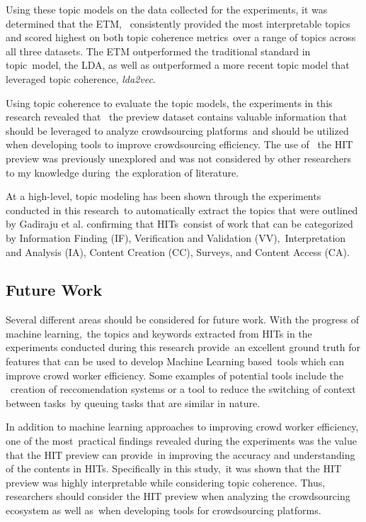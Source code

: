 \documentclass[letterpaper,12pt]{article}
\begin{document}
Using these topic models on the data collected for the experiments, it was determined that the ETM, \
consistently provided the most interpretable topics and scored highest on both topic coherence metrics\
over a range of topics across all three datasets. The ETM outperformed the traditional standard in topic\
model, the LDA, as well as outperformed a more recent topic model that leveraged topic coherence, \emph{lda2vec}.

Using topic coherence to evaluate the topic models, the experiments in this research revealed that \
the preview dataset contains valuable information that should be leveraged to analyze crowdsourcing platforms\
and should be utilized when developing tools to improve crowdsourcing efficiency. The use of \
the HIT preview was previously unexplored and was not considered by other researchers to my knowledge during\
the exploration of literature.

At a high-level, topic modeling has been shown through the experiments conducted in this research\
to automatically extract the topics that were outlined by Gadiraju et al. confirming that HITs\
consist of work that can be categorized by Information Finding (IF), Verification and Validation (VV),\
Interpretation and Analysis (IA), Content Creation (CC), Surveys, and Content Access (CA).
\subsection{Future Work}
Several different areas should be considered for future work. With the progress of machine learning,\
the topics and keywords extracted from HITs in the experiments conducted during this research provide\
an excellent ground truth for features that can be used to develop Machine Learning based\
tools which can improve crowd worker efficiency. Some examples of potential tools include the \
creation of reccomendation systems or a tool to reduce the switching of context between tasks\
by queuing tasks that are similar in nature.

In addition to machine learning approaches to improving crowd worker efficiency, one of the most\
practical findings revealed during the experiments was the value that the HIT preview can provide\
in improving the accuracy and understanding of the contents in HITs. Specifically in this study,\
it was shown that the HIT preview was highly interpretable while considering topic coherence.
Thus, researchers should consider the HIT preview when analyzing the crowdsourcing ecosystem as well as\
when developing tools for crowdsourcing platforms.
\end{document}
